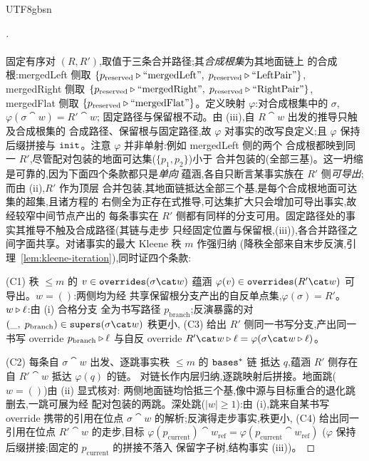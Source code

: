 \begin{CJK*}{UTF8}{gbsn}
\begin{proof}[]
  \paragraph{}
  固定有序对 $(R, R')$,取值于三条合并路径;其\emph{合成根集}为其地面链上
  的合成根:mergedLeft 侧取
  $\{p_{\mathrm{reserved}} \mathbin{\triangleright} \text{``mergedLeft''},\;
  p_{\mathrm{reserved}} \mathbin{\triangleright} \text{``LeftPair''}\}$,
  mergedRight 侧取
  $\{p_{\mathrm{reserved}} \mathbin{\triangleright} \text{``mergedRight''},\;
  p_{\mathrm{reserved}} \mathbin{\triangleright} \text{``RightPair''}\}$,
  mergedFlat 侧取
  $\{p_{\mathrm{reserved}} \mathbin{\triangleright} \text{``mergedFlat''}\}$。定义映射
  $\varphi$:对合成根集中的 $\sigma$,$\varphi(\sigma \cat w) = R' \cat w$;
  固定路径与保留根不动。由 (iii),自 $R \cat w$ 出发的推导只触及合成根集的
  合成路径、保留根与固定路径,故 $\varphi$ 对事实的改写良定义;且 $\varphi$
  保持后缀拼接与 $\mathtt{init}$。注意 $\varphi$ 并非单射:例如 mergedLeft 侧的两个
  合成根都映到同一 $R'$,尽管配对包装的地面可达集($\{p_1, p_2\}$)小于
  合并包装的(全部三基)。这一坍缩是可靠的,因为下面四个条款都只是\emph{单向}
  蕴涵,各自只断言某事实族在 $R'$ 侧\emph{可导出};而由 (ii),$R'$ 作为顶层
  合并包装,其地面链抵达全部三个基,是每个合成根地面可达集的超集,且诸方程的
  右侧全为正存在式推导,可达集扩大只会增加可导出事实,故经较窄中间节点产出的
  每条事实在 $R'$ 侧都有同样的分支可用。固定路径处的事实其推导不触及合成路径(其链与走步
  只经固定位置与保留根,(iii)),各合并路径之间字面共享。对诸事实的最大 Kleene 秩 $m$ 作强归纳
  (降秩全部来自末步反演,引理~\ref{lem:kleene-iteration}),同时证四个条款:

  (C1) 秩 $\le m$ 的 $v \in \overrides(\sigma \cat w)$ 蕴涵
  $\varphi(v) \in \overrides(R' \cat w)$ 可导出。$w = ()$:两侧均为经
  共享保留根分支产出的自反单点集,$\varphi(\sigma) = R'$。
  $w \mathbin{\triangleright} \ell$:由 (i) 合格分支
  全为书写路径 $p_{\mathrm{branch}}$;反演暴露的对
  $(\_,\; p_{\mathrm{branch}}) \in \supers(\sigma \cat w)$ 秩更小,
  (C3) 给出 $R'$ 侧同一书写分支,产出同一书写 override
  $p_{\mathrm{branch}} \mathbin{\triangleright} \ell$ 与自反 override
  $R' \cat w \snoc \ell = \varphi(\sigma \cat w \snoc \ell)$。

  (C2) 每条自 $\sigma \cat w$ 出发、逐跳事实秩 $\le m$ 的 $\mathtt{bases}^*$ 链
  抵达 $q$,蕴涵 $R'$ 侧存在自 $R' \cat w$ 抵达 $\varphi(q)$ 的链。
  对链长作内层归纳,逐跳映射后拼接。地面跳($w = ()$)由 (ii) 显式核对:
  两侧地面链均恰抵三个基,像中源与目标重合的退化跳删去,一跳可展为经
  配对包装的两跳。深处跳($|w| \ge 1$):由 (i),跳来自某书写 override
  携带的引用在位点 $\sigma \cat w$ 的解析;反演得走步事实,秩更小,
  (C4) 给出同一引用在位点 $R' \cat w$ 的走步,目标
  $\varphi(p_{\mathrm{current}}) \cat w_{\mathrm{ref}}
  = \varphi(p_{\mathrm{current}} \cat w_{\mathrm{ref}})$
  ($\varphi$ 保持后缀拼接;固定的 $p_{\mathrm{current}}$ 的拼接不落入
  保留字子树,结构事实 (iii))。


\end{proof}
\end{CJK*}
